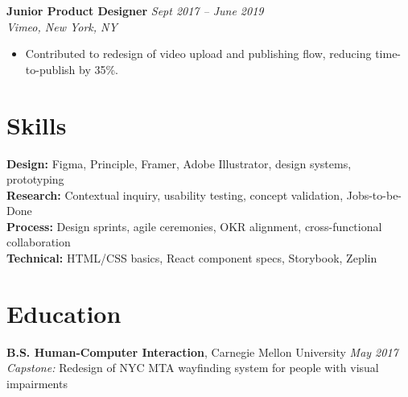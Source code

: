 \documentclass[11pt,a4paper]{article}
\begin{document}
\vspace{4pt}
\noindent\textbf{Junior Product Designer} \hfill \textit{Sept 2017 -- June 2019}\\
\textit{Vimeo, New York, NY}
\begin{itemize}
  \item Contributed to redesign of video upload and publishing flow, reducing time-to-publish by 35\%.
\end{itemize}

\section{Skills}
\textbf{Design:} Figma, Principle, Framer, Adobe Illustrator, design systems, prototyping\\
\textbf{Research:} Contextual inquiry, usability testing, concept validation, Jobs-to-be-Done\\
\textbf{Process:} Design sprints, agile ceremonies, OKR alignment, cross-functional collaboration\\
\textbf{Technical:} HTML/CSS basics, React component specs, Storybook, Zeplin

\section{Education}
\textbf{B.S. Human-Computer Interaction}, Carnegie Mellon University \hfill \textit{May 2017}\\
\textit{Capstone:} Redesign of NYC MTA wayfinding system for people with visual impairments
\end{document}
